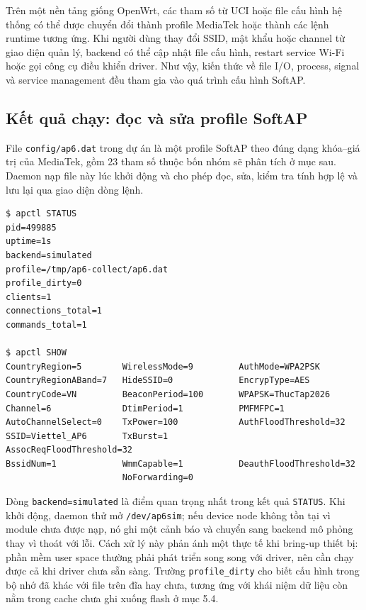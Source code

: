 \documentclass[11pt]{article}
\newcommand{\code}[1]{\texttt{#1}}
\begin{document}
Trên một nền tảng giống OpenWrt, các tham số từ UCI hoặc file cấu hình hệ thống có thể được chuyển đổi thành profile MediaTek hoặc thành các lệnh runtime tương ứng. Khi người dùng thay đổi SSID, mật khẩu hoặc channel từ giao diện quản lý, backend có thể cập nhật file cấu hình, restart service Wi-Fi hoặc gọi công cụ điều khiển driver. Như vậy, kiến thức về file I/O, process, signal và service management đều tham gia vào quá trình cấu hình SoftAP.

\subsection{Kết quả chạy: đọc và sửa profile SoftAP}

File \code{config/ap6.dat} trong dự án là một profile SoftAP theo đúng dạng khóa--giá trị của MediaTek, gồm 23 tham số thuộc bốn nhóm sẽ phân tích ở mục sau. Daemon nạp file này lúc khởi động và cho phép đọc, sửa, kiểm tra tính hợp lệ và lưu lại qua giao diện dòng lệnh.

\begin{lstlisting}[caption={Trạng thái daemon và toàn bộ profile SoftAP}]
$ apctl STATUS
pid=499885
uptime=1s
backend=simulated
profile=/tmp/ap6-collect/ap6.dat
profile_dirty=0
clients=1
connections_total=1
commands_total=1

$ apctl SHOW
CountryRegion=5        WirelessMode=9         AuthMode=WPA2PSK
CountryRegionABand=7   HideSSID=0             EncrypType=AES
CountryCode=VN         BeaconPeriod=100       WPAPSK=ThucTap2026
Channel=6              DtimPeriod=1           PMFMFPC=1
AutoChannelSelect=0    TxPower=100            AuthFloodThreshold=32
SSID=Viettel_AP6       TxBurst=1              AssocReqFloodThreshold=32
BssidNum=1             WmmCapable=1           DeauthFloodThreshold=32
                       NoForwarding=0
\end{lstlisting}

Dòng \code{backend=simulated} là điểm quan trọng nhất trong kết quả \code{STATUS}. Khi khởi động, daemon thử mở \code{/dev/ap6sim}; nếu device node không tồn tại vì module chưa được nạp, nó ghi một cảnh báo và chuyển sang backend mô phỏng thay vì thoát với lỗi. Cách xử lý này phản ánh một thực tế khi bring-up thiết bị: phần mềm user space thường phải phát triển song song với driver, nên cần chạy được cả khi driver chưa sẵn sàng. Trường \code{profile\_dirty} cho biết cấu hình trong bộ nhớ đã khác với file trên đĩa hay chưa, tương ứng với khái niệm dữ liệu còn nằm trong cache chưa ghi xuống flash ở mục 5.4.
\end{document}

